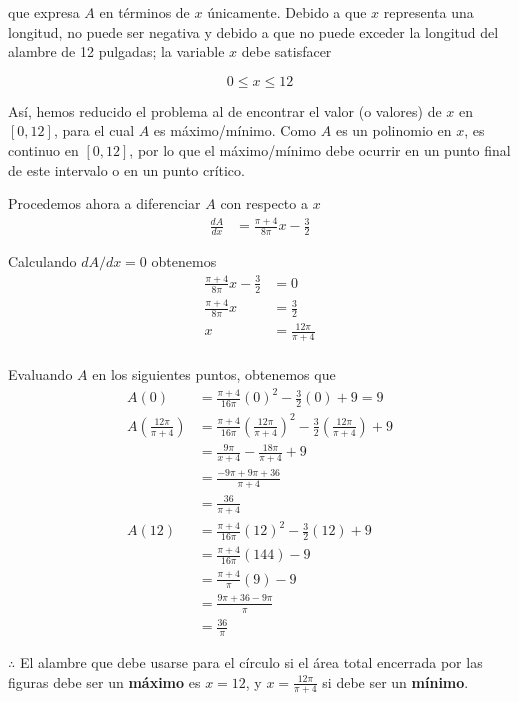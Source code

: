 \documentclass[12pt]{article}
\begin{document}
que expresa $A$ en términos de $x$ únicamente. Debido a que $x$ representa una longitud, no puede ser negativa y debido a que no puede exceder la longitud del alambre de 12 pulgadas; la variable $x$ debe satisfacer

\[
0 \leq x \leq 12
\]

Así, hemos reducido el problema al de encontrar el valor (o valores) de $x$ en $[0, 12]$, para el cual $A$ es máximo/mínimo. Como $A$ es un polinomio en $x$, es continuo en $[0, 12]$, por lo que el máximo/mínimo debe ocurrir en un punto final de este intervalo o en un punto crítico.

Procedemos ahora a diferenciar $A$ con respecto a $x$
\begin{align*}
  \frac{dA}{dx}
  &= \frac{\pi+4}{8\pi}x-\frac{3}{2}
\end{align*}

Calculando $dA/dx = 0$ obtenemos
\begin{align*}
  \frac{\pi+4}{8\pi}x-\frac{3}{2}
  &= 0\\
  \frac{\pi+4}{8\pi}x
  &=\frac{3}{2}\\
  x
  &=\frac{12\pi}{\pi+4}\\
\end{align*}

Evaluando $A$ en los siguientes puntos, obtenemos que
\begin{align*}
  A(0)
  &= \frac{\pi + 4}{16\pi}(0)^2-\frac{3}{2}(0)+9=9\\
  A\left(\frac{12\pi}{\pi+4}\right)
  &= \frac{\pi + 4}{16\pi}\left(\frac{12\pi}{\pi+4}\right)^2-\frac{3}{2}\left(\frac{12\pi}{\pi+4}\right)+9 \\
  &= \frac{9\pi}{x+4}-\frac{18\pi}{\pi+4}+9 \\
  &= \frac{-9\pi+9\pi+36}{\pi+4} \\
  &= \frac{36}{\pi+4}\\
  A(12)
  &= \frac{\pi + 4}{16\pi}(12)^2-\frac{3}{2}(12)+9\\
  &= \frac{\pi + 4}{16\pi}(144)-9\\
  &= \frac{\pi + 4}{\pi}(9)-9\\
  &= \frac{9\pi + 36-9\pi}{\pi}\\
  &= \frac{36}{\pi}
\end{align*}

$\therefore $ El alambre que debe usarse para el círculo si el área total encerrada por las figuras debe ser un \textbf{máximo} es $x=12$, y $x=\frac{12\pi}{\pi+4}$ si debe ser un \textbf{mínimo}.
\end{document}
